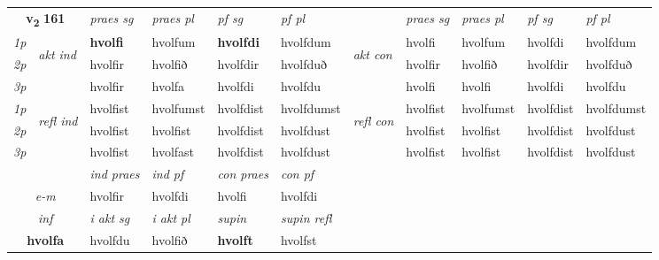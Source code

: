 \noindent
\begin{tabular}{lllllllllll} \toprule
\multicolumn{2}{c}{\textbf{v{\textsubscript{2}}} \Large{\textbf{161}}}  &  \textit{praes sg}  & \textit{praes pl}  &\textit{ pf sg} & \textit{pf pl} &  &  \textit{praes sg}  & \textit{praes pl}  & \textit{pf sg} & \textit{pf pl } \\*
	\cmidrule{3-6} \cmidrule{8-11}
 {\textit{1p}} & \multirow{3}{*}{\begin{turn}{90}\textit{akt ind}\end{turn}} & \textbf{hvolfi} & hvolfum & \textbf{hvolfdi} & hvolfdum & \multirow{3}{*}{\begin{turn}{90}\textit{akt con}\end{turn}} &hvolfi & hvolfum & hvolfdi & hvolfdum\\*
 {\textit{2p}} &  &  hvolfir  & hvolfið & hvolfdir & hvolfduð & & hvolfir & hvolfið & hvolfdir & hvolfduð \\*
{\textit{3p}} &  & hvolfir & hvolfa & hvolfdi & hvolfdu & & hvolfi & hvolfi& hvolfdi & hvolfdu \\*
\cmidrule{3-6} \cmidrule{8-11}
 {\textit{1p}} & \multirow{3}{*}{\begin{turn}{90}\textit{refl ind}\end{turn}}  & hvolfist & hvolfumst & hvolfdist & hvolfdumst & \multirow{3}{*}{\begin{turn}{90}\textit{refl con}\end{turn}}  &hvolfist & hvolfumst & hvolfdist & hvolfdumst \\*
 {\textit{2p}} &  & hvolfist & hvolfist & hvolfdist & hvolfdust & &hvolfist & hvolfist & hvolfdist & hvolfdust \\*
 {\textit{3p}}  & & hvolfist & hvolfast & hvolfdist & hvolfdust & & hvolfist & hvolfist& hvolfdist & hvolfdust \\*
\cmidrule{3-6} \cmidrule{8-11}

   & &  \textit{ind praes} & \textit{ind pf} & \textit{con praes} & \textit{con pf} \\*
\multicolumn{2}{c}{ \textit{e-m} } & hvolfir & hvolfdi & hvolfi & hvolfdi \\*

\cmidrule{3-6}
   \multicolumn{2}{c}{\textit{inf}}  & \textit{i akt sg} & \textit{i akt pl}    & \textit{supin} & \textit{supin refl}  \\*
  \multicolumn{2}{c}{\textbf{hvolfa}} & hvolfdu  & hvolfið    &  \textbf{hvolft} & hvolfst  \\*
\end{tabular}

